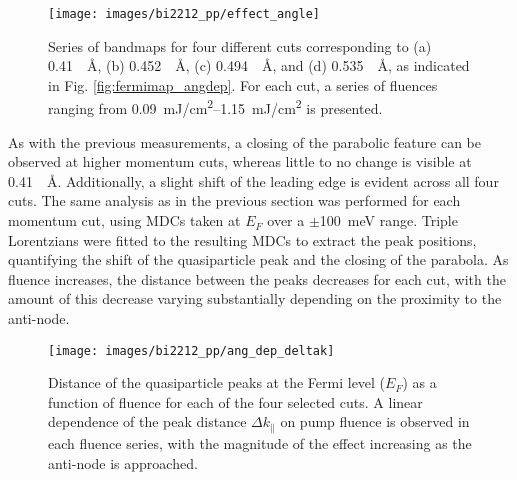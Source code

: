 \begin{figure}[p]
	\centering
	\texttt{[image: images/bi2212\_pp/effect\_angle]}
	\caption{Series of bandmaps for four different cuts corresponding to (a) \qty{0.41}{\per\angstrom}, (b) \qty{0.452}{\per\angstrom}, (c) \qty{0.494}{\per\angstrom}, and (d) \qty{0.535}{\per\angstrom}, as indicated in Fig. \ref{fig:fermimap_angdep}. For each cut, a series of fluences ranging from \qtyrange{0.09}{1.15}{\milli\joule/\centi\meter\squared} is presented.}
	\label{fig:effect_angle}
\end{figure}

As with the previous measurements, a closing of the parabolic feature can be observed at higher momentum cuts, whereas little to no change is visible at \qty{0.41}{\per\angstrom}.
Additionally, a slight shift of the leading edge is evident across all four cuts.
The same analysis as in the previous section was performed for each momentum cut, using MDCs taken at $E_F$ over a $\pm$\qty{100}{\milli\electronvolt} range.
Triple Lorentzians were fitted to the resulting MDCs to extract the peak positions, quantifying the shift of the quasiparticle peak and the closing of the parabola.
As fluence increases, the distance between the peaks decreases for each cut, with the amount of this decrease varying substantially depending on the proximity to the anti-node.

\begin{figure}[th!]
	\centering
	\texttt{[image: images/bi2212\_pp/ang\_dep\_deltak]}
	\caption{Distance of the quasiparticle peaks at the Fermi level ($E_F$) as a function of fluence for each of the four selected cuts. A linear dependence of the peak distance $\Delta k_\parallel$ on pump fluence is observed in each fluence series, with the magnitude of the effect increasing as the anti-node is approached.}
	\label{fig:angdep_deltak}
\end{figure}

